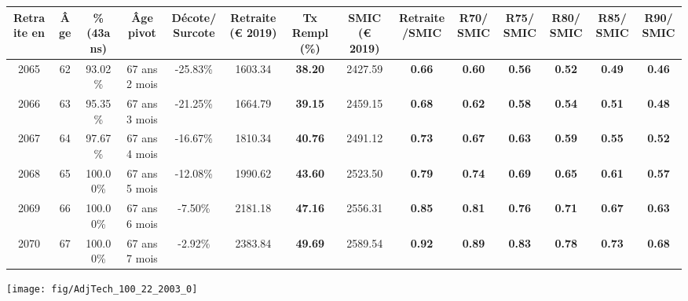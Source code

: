 \begin{adjustbox}{max width=\textwidth} 
\begin{tabular}[htb]{|c|c||c|c|c||c|c||c|c||c|c|c|c|c|} 
\hline 
 Retraite en &  Âge &  \%(43ans) &  Âge pivot &  Décote/Surcote &  Retraite (\euro{} 2019) &  Tx Rempl(\%) &  SMIC (\euro{} 2019) &  Retraite/SMIC &  R70/SMIC &  R75/SMIC &  R80/SMIC &  R85/SMIC &  R90/SMIC \\ 
\hline \hline 
 2065 &  62 &  93.02\% &  67 ans 2 mois &  -25.83\% &  1603.34 &  {\bf 38.20} &  2427.59 &  {\bf {\color{red} 0.66}} &  {\bf {\color{red} 0.60}} &  {\bf {\color{red} 0.56}} &  {\bf {\color{red} 0.52}} &  {\bf {\color{red} 0.49}} &  {\bf {\color{red} 0.46}} \\ 
\hline 
 2066 &  63 &  95.35\% &  67 ans 3 mois &  -21.25\% &  1664.79 &  {\bf 39.15} &  2459.15 &  {\bf {\color{red} 0.68}} &  {\bf {\color{red} 0.62}} &  {\bf {\color{red} 0.58}} &  {\bf {\color{red} 0.54}} &  {\bf {\color{red} 0.51}} &  {\bf {\color{red} 0.48}} \\ 
\hline 
 2067 &  64 &  97.67\% &  67 ans 4 mois &  -16.67\% &  1810.34 &  {\bf 40.76} &  2491.12 &  {\bf {\color{red} 0.73}} &  {\bf {\color{red} 0.67}} &  {\bf {\color{red} 0.63}} &  {\bf {\color{red} 0.59}} &  {\bf {\color{red} 0.55}} &  {\bf {\color{red} 0.52}} \\ 
\hline 
 2068 &  65 &  100.00\% &  67 ans 5 mois &  -12.08\% &  1990.62 &  {\bf 43.60} &  2523.50 &  {\bf {\color{red} 0.79}} &  {\bf {\color{red} 0.74}} &  {\bf {\color{red} 0.69}} &  {\bf {\color{red} 0.65}} &  {\bf {\color{red} 0.61}} &  {\bf {\color{red} 0.57}} \\ 
\hline 
 2069 &  66 &  100.00\% &  67 ans 6 mois &  -7.50\% &  2181.18 &  {\bf 47.16} &  2556.31 &  {\bf {\color{red} 0.85}} &  {\bf {\color{red} 0.81}} &  {\bf {\color{red} 0.76}} &  {\bf {\color{red} 0.71}} &  {\bf {\color{red} 0.67}} &  {\bf {\color{red} 0.63}} \\ 
\hline 
 2070 &  67 &  100.00\% &  67 ans 7 mois &  -2.92\% &  2383.84 &  {\bf 49.69} &  2589.54 &  {\bf {\color{red} 0.92}} &  {\bf {\color{red} 0.89}} &  {\bf {\color{red} 0.83}} &  {\bf {\color{red} 0.78}} &  {\bf {\color{red} 0.73}} &  {\bf {\color{red} 0.68}} \\ 
\hline 
\hline 
\end{tabular} 
\end{adjustbox} 
 
 \vspace{0.1cm} 

 {\hspace{-2.2cm}\texttt{[image: fig/AdjTech\_100\_22\_2003\_0]}} 

